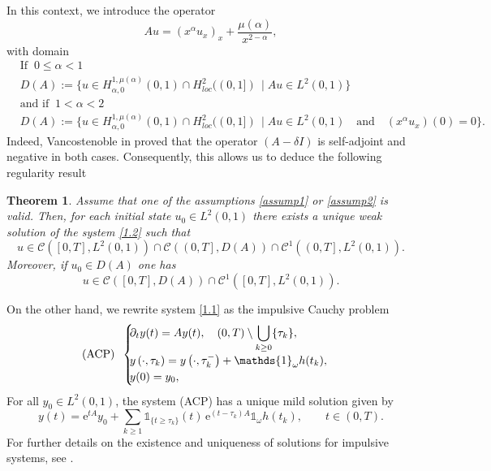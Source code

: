\documentclass[sn-mathphys]{sn-jnl}
\newtheorem{theorem}{Theorem}[section]
\begin{document}
In this context, we introduce the operator
    \begin{equation*}
        Au= (x^{\alpha} u_x)_x + \dfrac{\mu(\alpha)}{x^{2-\alpha}},
    \end{equation*}
with domain 
     \begin{equation}\label{DA2}
        \begin{aligned}
            &\text{If}\;\; 0\leq \alpha <1\\
			&D(A):=\big\{u\in H_{\alpha, 0}^{1,\mu(\alpha)}(0,1)\cap H_{loc}^2((0,1])\, \mid  Au \in L^2(0,1) \big\}\\
			&\text{and if}\;\; 1< \alpha<2\\
			&D(A):=\big\{u\in H_{\alpha, 0}^{1,\mu(\alpha)}(0,1)\cap H_{loc}^2((0,1])\, \mid  Au \in L^2(0,1)\quad \text{and}\quad (x^{\alpha}u_x)(0)=0 \big\}.
		\end{aligned}
  \end{equation}
Indeed, Vancostenoble in \citep{V} proved that the operator $(A-\delta I)$ is self-adjoint and negative in both cases. Consequently, this allows us to deduce the following regularity result
    \begin{theorem}\label{thm2.3}
        Assume that one of the assumptions \eqref{assump1} or \eqref{assump2} is valid. Then, for each initial state $u_0 \in L^2(0,1)$ there exists a unique weak solution of the system \eqref{1.2} such that
            \begin{equation*}
			u \in \mathcal{C}\left( \left[0,T \right], L^2(0,1) \right) \cap \mathcal{C}\left( \left(0,T \right], D(A) \right) \cap \mathcal{C}^1\left( \left(0,T \right], L^2(0,1) \right).
		\end{equation*}
        Moreover, if $u_0 \in D(A)$ one has
        \begin{equation*}
			u \in \mathcal{C}\left( \left[0,T \right], D(A) \right) \cap \mathcal{C}^1\left( \left[0,T \right], L^2(0,1) \right).
		\end{equation*}
    \end{theorem}
On the other hand, we rewrite system \eqref{1.1} as the impulsive Cauchy problem
\begin{equation}
\text{(ACP)} \;\; \begin{cases}
\hspace{-0.1cm} \partial_t y(t)=A y(t), \quad (0,T)\setminus \displaystyle \bigcup _{k\geq 0 }\{\tau_{k}\}, \nonumber\\
\hspace{-0.1cm} y\left(\cdot,\tau_{k}\right) = y\left(\cdot,\tau_{k}^{-}\right) + \mathds{1}_{\omega} h(t_{k}),\nonumber\\
\hspace{-0.1cm} y(0)=y_0, \nonumber
\end{cases}
\end{equation}
For all $y_0\in L^2(0,1)$, the system (ACP) has a unique mild solution given by 
    \begin{equation}\label{sol1}
        y(t) = \mathrm{e}^{t A} y_{0} + \sum_{k\geq 1} \mathds{1}_{\{t\geq \tau_{k} \}}(t)\, \mathrm{e}^{(t-\tau_{k})A} \mathds{1}_{\omega} h(t_{k}), \qquad t\in (0,T).
    \end{equation}
For further details on the existence and uniqueness of solutions for impulsive systems, see \citep{FO, SLAPWZ2}.
\end{document}
